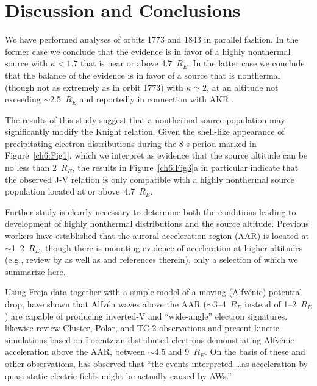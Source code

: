   \section{Discussion and Conclusions}

  We have performed analyses of orbits 1773 and 1843 in parallel fashion. In the
  former case we conclude that the evidence is in favor of a highly nonthermal
  source with $\kappa < 1.7$ that is near or above 4.7~$R_E$. In the latter case
  we conclude that the balance of the evidence is in favor of a source that is
  nonthermal (though not as extremely as in orbit 1773) with $\kappa \simeq 2$,
  at an altitude not exceeding $\sim$2.5~$R_E$ and reportedly in connection with
  AKR \citep{Ergun1998}.

  The results of this study suggest that a nonthermal source population may
  significantly modify the Knight relation. Given the shell-like appearance of
  precipitating electron distributions during the 8-s period marked in
  Figure~\ref{ch6:Fig1}, which we interpret as evidence that the source altitude
  can be no less than 2~$R_E$, the results in Figure~\ref{ch6:Fig3}a in
  particular indicate that the observed J-V relation is only compatible with a
  highly nonthermal source population located at or above~4.7~$R_E$. 

  Further study is clearly necessary to determine both the conditions leading to
  development of highly nonthermal distributions and the source
  altitude. Previous workers have established that the auroral acceleration
  region (AAR) is located at $\sim$1--2~$R_E$, though there is mounting evidence
  of acceleration at higher altitudes (e.g., review by \citet{Mottez2016} as
  well as \citet{Watt2012} and references therein), only a selection of which we
  summarize here.

  Using Freja data together with a simple model of a moving (Alfv\'{e}nic)
  potential drop, \citet{Andersson2002a} have shown that Alfv\'{e}n waves above
  the AAR ($\sim$3--4~$R_E$ instead of 1--2~$R_E$) are capable of producing
  inverted-V and ``wide-angle'' electron signatures. \citet{Watt2012} likewise
  review Cluster, Polar, and TC-2 observations and present kinetic simulations
  based on Lorentzian-distributed electrons demonstrating Alfv\'{e}nic
  acceleration above the AAR, between $\sim$4.5 and 9~$R_E$. On the basis of
  these and other observations, \citet{Mottez2016} has observed that ``the
  events interpreted \dots as acceleration by quasi-static electric fields might
  be actually caused by AWs.''

